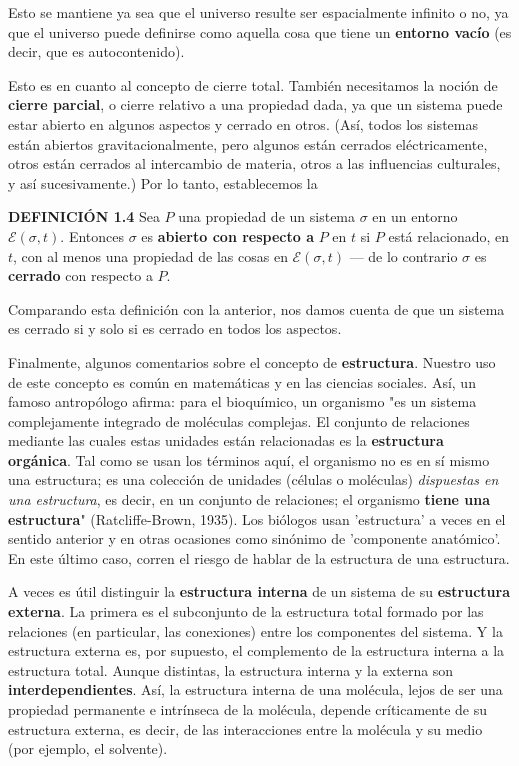 {\fontsize{13}{15}\selectfont
Esto se mantiene ya sea que el universo resulte ser espacialmente infinito o no, ya que el universo puede definirse como aquella cosa que tiene un \textbf{entorno vacío} (es decir, que es autocontenido).

Esto es en cuanto al concepto de cierre total. También necesitamos la noción de \textbf{cierre parcial}, o cierre relativo a una propiedad dada, ya que un sistema puede estar abierto en algunos aspectos y cerrado en otros. (Así, todos los sistemas están abiertos gravitacionalmente, pero algunos están cerrados eléctricamente, otros están cerrados al intercambio de materia, otros a las influencias culturales, y así sucesivamente.) Por lo tanto, establecemos la

\textbf{DEFINICIÓN 1.4} Sea $P$ una propiedad de un sistema $\sigma$ en un entorno $\mathcal{E}(\sigma, t)$. Entonces $\sigma$ es \textbf{abierto con respecto a} $P$ en $t$ si $P$ está relacionado, en $t$, con al menos una propiedad de las cosas en $\mathcal{E}(\sigma, t)$ — de lo contrario $\sigma$ es \textbf{cerrado} con respecto a $P$.

Comparando esta definición con la anterior, nos damos cuenta de que un sistema es cerrado si y solo si es cerrado en todos los aspectos.

Finalmente, algunos comentarios sobre el concepto de \textbf{estructura}. Nuestro uso de este concepto es común en matemáticas y en las ciencias sociales. Así, un famoso antropólogo afirma: para el bioquímico, un organismo "es un sistema complejamente integrado de moléculas complejas. El conjunto de relaciones mediante las cuales estas unidades están relacionadas es la \textbf{estructura orgánica}. Tal como se usan los términos aquí, el organismo no es en sí mismo una estructura; es una colección de unidades (células o moléculas) \textit{dispuestas en una estructura}, es decir, en un conjunto de relaciones; el organismo \textbf{tiene una estructura}" (Ratcliffe-Brown, 1935). Los biólogos usan 'estructura' a veces en el sentido anterior y en otras ocasiones como sinónimo de 'componente anatómico'. En este último caso, corren el riesgo de hablar de la estructura de una estructura.

A veces es útil distinguir la \textbf{estructura interna} de un sistema de su \textbf{estructura externa}. La primera es el subconjunto de la estructura total formado por las relaciones (en particular, las conexiones) entre los componentes del sistema. Y la estructura externa es, por supuesto, el complemento de la estructura interna a la estructura total. Aunque distintas, la estructura interna y la externa son \textbf{interdependientes}. Así, la estructura interna de una molécula, lejos de ser una propiedad permanente e intrínseca de la molécula, depende críticamente de su estructura externa, es decir, de las interacciones entre la molécula y su medio (por ejemplo, el solvente).

}
